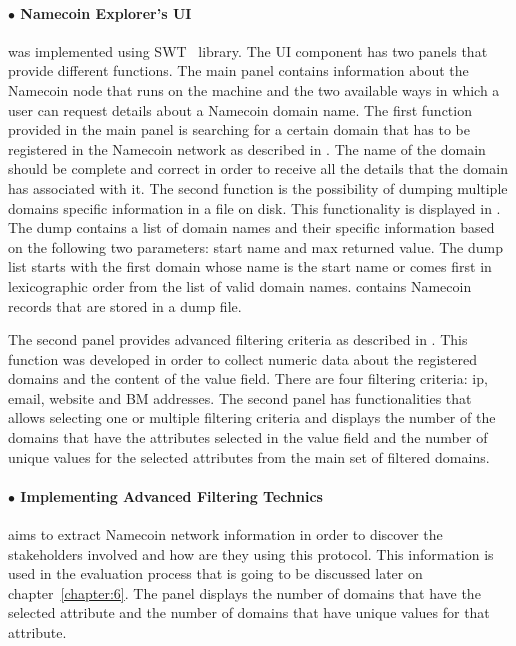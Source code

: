 \paragraph{$\bullet$ Namecoin Explorer's UI} was implemented using SWT~\cite{swtbook} library. The UI component has two panels that provide different functions. The main panel contains information about the Namecoin node that runs on the machine and the two available ways in which a user can request details about a Namecoin domain name. The first function provided in the main panel is searching for a certain domain  that has to be registered in the Namecoin network as described in . The name of the domain should be complete and correct in order to receive all the details that the domain has associated with it.
The second function is the possibility of dumping multiple domains specific information in a file on disk. This functionality is displayed in . The dump contains a list of domain names and their specific information based on the following two parameters: start name and max returned value. The dump list starts with the first domain whose name is the start name or comes first in lexicographic order from the list of valid domain names.  contains Namecoin records that are stored in a dump file.

The second panel provides advanced filtering criteria as described in  . This function was developed in order to collect numeric data about the registered domains and the content of the value field. There are four filtering criteria: ip, email, website and BM addresses. The second panel has functionalities that allows selecting one or multiple filtering criteria and displays the number of the domains that have the attributes selected in the value field and the number of unique values for the selected attributes from the main set of filtered domains.

\paragraph{$\bullet$ Implementing Advanced Filtering Technics} aims to extract Namecoin network information in order to discover the stakeholders involved and how are they using this protocol. This information is used in the evaluation process that is going to be discussed later on chapter~\ref{chapter:6}. The panel displays the number of domains that have the selected attribute and the number of domains that have unique values for that attribute.

